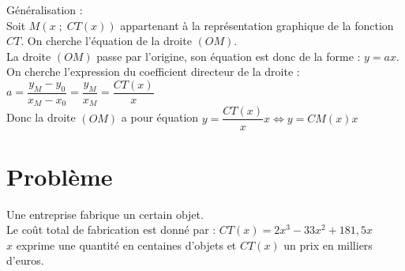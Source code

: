 Généralisation : \\

Soit $M\left(x \; ; \; CT(x)\right)$ appartenant à la représentation graphique de la fonction $CT$. On cherche l'équation de la droite $\left(OM\right)$. \\

La droite $\left(OM\right)$ passe par l'origine, son équation est donc de la forme : $y = ax$. \\

On cherche l'expression du coefficient directeur de la droite : \\

$a = \dfrac{y_M - y_0}{x_M - x_0} = \dfrac{y_M}{x_M} = \dfrac{CT(x)}{x}$ \\

Donc la droite $\left(OM\right)$ a pour équation $ y = \dfrac{CT(x)}{x}x \Longleftrightarrow y = CM(x)x$ \\

\newpage

\section{Problème}

Une entreprise fabrique un certain objet. \\
Le coût total de fabrication est donné par : $CT(x) = 2x^3 -33x^2 + 181,5x$ \\
$x$ exprime une quantité en centaines d'objets et $CT(x)$ un prix en milliers d'euros. \\

